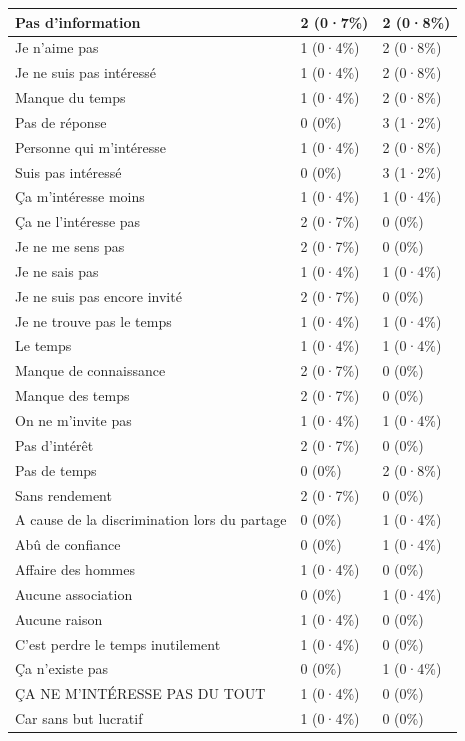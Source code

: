 \documentclass[
]{book}
\begin{document}
\begin{tabular}{l|l|l}
\hline
Pas d'information & 2 (0·7\%) & 2 (0·8\%)\\
\hline
Je n'aime pas & 1 (0·4\%) & 2 (0·8\%)\\
\hline
Je ne suis pas intéressé & 1 (0·4\%) & 2 (0·8\%)\\
\hline
Manque du temps & 1 (0·4\%) & 2 (0·8\%)\\
\hline
Pas de réponse & 0 (0\%) & 3 (1·2\%)\\
\hline
Personne qui m'intéresse & 1 (0·4\%) & 2 (0·8\%)\\
\hline
Suis pas intéressé & 0 (0\%) & 3 (1·2\%)\\
\hline
Ça m'intéresse moins & 1 (0·4\%) & 1 (0·4\%)\\
\hline
Ça ne l'intéresse pas & 2 (0·7\%) & 0 (0\%)\\
\hline
Je ne me sens pas & 2 (0·7\%) & 0 (0\%)\\
\hline
Je ne sais pas & 1 (0·4\%) & 1 (0·4\%)\\
\hline
Je ne suis pas encore invité & 2 (0·7\%) & 0 (0\%)\\
\hline
Je ne trouve pas le temps & 1 (0·4\%) & 1 (0·4\%)\\
\hline
Le temps & 1 (0·4\%) & 1 (0·4\%)\\
\hline
Manque de connaissance & 2 (0·7\%) & 0 (0\%)\\
\hline
Manque des temps & 2 (0·7\%) & 0 (0\%)\\
\hline
On ne m'invite pas & 1 (0·4\%) & 1 (0·4\%)\\
\hline
Pas d'intérêt & 2 (0·7\%) & 0 (0\%)\\
\hline
Pas de temps & 0 (0\%) & 2 (0·8\%)\\
\hline
Sans rendement & 2 (0·7\%) & 0 (0\%)\\
\hline
A cause de la discrimination lors du partage & 0 (0\%) & 1 (0·4\%)\\
\hline
Abû de confiance & 0 (0\%) & 1 (0·4\%)\\
\hline
Affaire des hommes & 1 (0·4\%) & 0 (0\%)\\
\hline
Aucune association & 0 (0\%) & 1 (0·4\%)\\
\hline
Aucune raison & 1 (0·4\%) & 0 (0\%)\\
\hline
C'est perdre le temps inutilement & 1 (0·4\%) & 0 (0\%)\\
\hline
Ça n'existe pas & 0 (0\%) & 1 (0·4\%)\\
\hline
ÇA NE M'INTÉRESSE PAS DU TOUT & 1 (0·4\%) & 0 (0\%)\\
\hline
Car sans but lucratif & 1 (0·4\%) & 0 (0\%)\\

\end{tabular}
\end{document}
